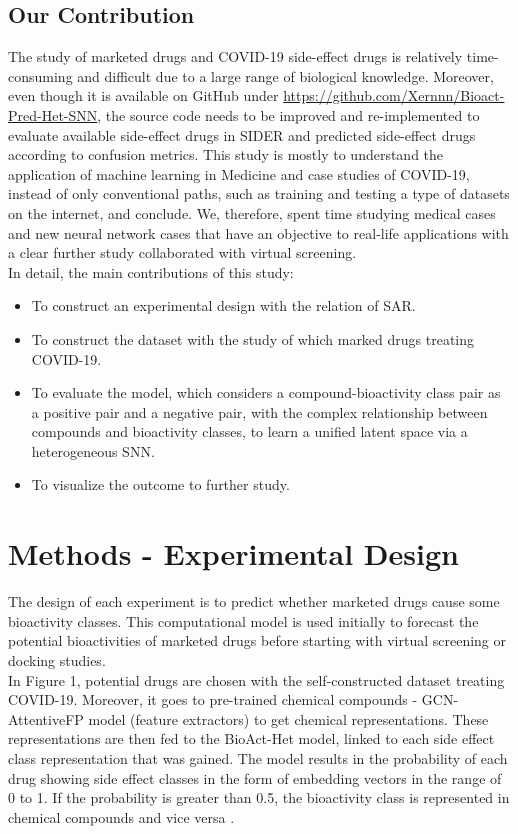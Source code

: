 \documentclass[conference]{IEEEtran}
\begin{document}
\subsection{Our Contribution}
The study of marketed drugs and COVID-19 side-effect drugs is relatively time-consuming and difficult due to a large range of biological knowledge. Moreover, even though it is available on GitHub under \url{https://github.com/Xernnn/Bioact-Pred-Het-SNN}, the source code needs to be improved and re-implemented to evaluate available side-effect drugs in SIDER and predicted side-effect drugs according to confusion metrics. This study is mostly to understand the application of machine learning in Medicine and case studies of COVID-19, instead of only conventional paths, such as training and testing a type of datasets on the internet, and conclude. We, therefore, spent time studying medical cases and new neural network cases that have an objective to real-life applications with a clear further study collaborated with virtual screening. \\

In detail, the main contributions of this study:
\begin{itemize}
  \item To construct an experimental design with the relation of SAR.
  \item To construct the dataset with the study of which marked drugs treating COVID-19.
  \item To evaluate the model, which considers a compound-bioactivity class pair as a positive pair and a negative pair, with the complex relationship between compounds and bioactivity classes, to learn a unified latent space via a heterogeneous SNN.
  \item To visualize the outcome to further study.
\end{itemize}


\section{Methods - Experimental Design}
The design of each experiment is to predict whether marketed drugs cause some bioactivity classes. This computational model is used initially to forecast the potential bioactivities of marketed drugs before starting with virtual screening or docking studies.\\

In Figure 1, potential drugs are chosen with the self-constructed dataset treating COVID-19. Moreover, it goes to pre-trained chemical compounds - GCN-AttentiveFP model (feature extractors) to get chemical representations. These representations are then fed to the BioAct-Het model, linked to each side effect class representation that was gained. The model results in the probability of each drug showing side effect classes in the form of embedding vectors in the range of 0 to 1. If the probability is greater than 0.5, the bioactivity class is represented in chemical compounds and vice versa \citet{Shih}.
\end{document}
